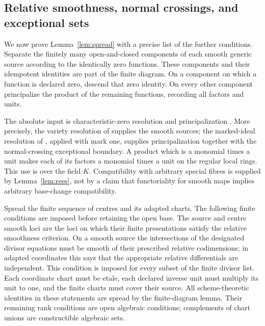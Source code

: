 \subsection{Relative smoothness, normal crossings, and exceptional sets}
We now prove Lemma~\ref{lem:spread} with a precise list of the further
conditions. Separate the finitely many open-and-closed components of each
smooth generic source according to the identically zero functions. These
components and their idempotent identities are part of the finite diagram.
On a component on which a function is declared zero, descend that zero
identity. On every other component principalize the product of the
remaining functions, recording all factors and units.

The absolute input is characteristic-zero resolution and principalization
\cite{BM97,BM08}. More precisely, the variety resolution of
\cite[Theorem 1.1]{BM08} supplies the smooth sources; the marked-ideal
resolution of \cite[Theorem 1.3]{BM08}, applied with mark one, supplies
principalization together with the normal-crossing exceptional boundary.
A product which is a monomial times a unit makes each of its factors a
monomial times a unit on the regular local rings. This use is over the
field $K$. Compatibility with arbitrary special fibres is supplied by
Lemma~\ref{lem:rees}, not by a claim that functoriality for smooth maps
implies arbitrary base-change compatibility.

Spread the finite sequence of centres and its adapted charts. The
following finite conditions are imposed before retaining the open base.
The source and centre smooth loci are the loci on which their finite
presentations satisfy the relative smoothness criterion. On a smooth
source the intersections of the designated divisor equations must be
smooth of their prescribed relative codimensions; in adapted coordinates
this says that the appropriate relative differentials are independent.
This condition is imposed for every subset of the finite divisor list.
Each coordinate chart must be etale, each declared inverse unit must
multiply its unit to one, and the finite charts must cover their source.
All scheme-theoretic identities in these statements are spread by the
finite-diagram lemma. Their remaining rank conditions are open algebraic
conditions; complements of chart unions are constructible algebraic sets.

